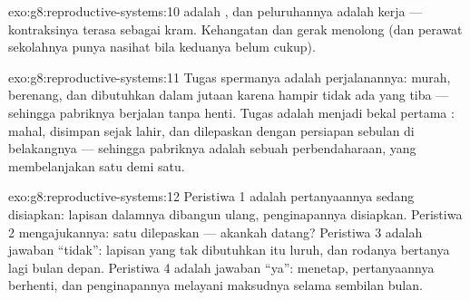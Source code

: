 \begin{solution}{exo:g8:reproductive-systems:10}
 adalah , dan peluruhannya adalah kerja  ---
kontraksinya terasa sebagai kram. Kehangatan dan gerak
menolong (dan perawat sekolahnya punya nasihat bila keduanya
belum cukup).
\end{solution}

\begin{solution}{exo:g8:reproductive-systems:11}
Tugas spermanya adalah perjalanannya: murah, berenang, dan
dibutuhkan dalam jutaan karena hampir tidak ada yang tiba
--- sehingga pabriknya berjalan tanpa henti. Tugas 
adalah menjadi bekal pertama : mahal, disimpan sejak
lahir, dan dilepaskan dengan persiapan sebulan di
belakangnya --- sehingga pabriknya adalah sebuah
perbendaharaan, yang membelanjakan satu demi satu.
\end{solution}

\begin{solution}{exo:g8:reproductive-systems:12}
Peristiwa 1 adalah pertanyaannya sedang disiapkan: lapisan
dalamnya dibangun ulang, penginapannya disiapkan. Peristiwa 2
mengajukannya: satu  dilepaskan --- akankah
 datang? Peristiwa 3 adalah jawaban ``tidak'':
lapisan yang tak dibutuhkan itu luruh, dan rodanya bertanya
lagi bulan depan. Peristiwa 4 adalah jawaban ``ya'':
 menetap, pertanyaannya berhenti, dan penginapannya
melayani maksudnya selama sembilan bulan.
\end{solution}

